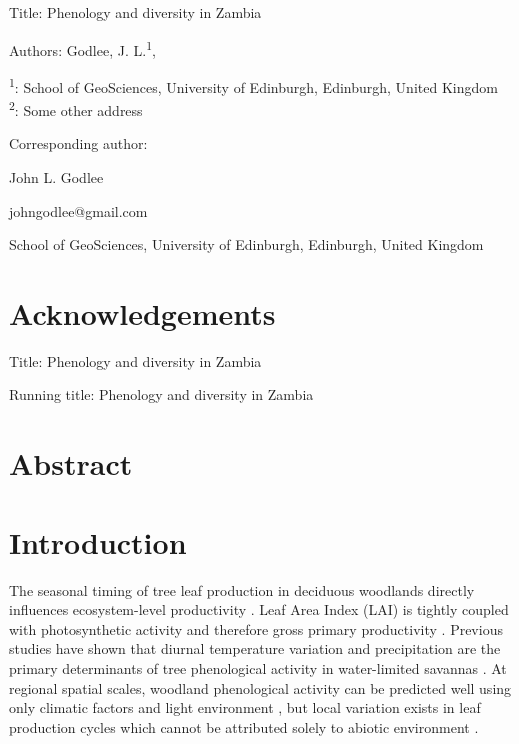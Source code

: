 \documentclass[11pt,a4paper]{article}
\newcommand{\titletext}{Phenology and diversity in Zambia}
\begin{document}
{\LARGE{Title: \titletext}}

\vspace{1cm}

Authors: Godlee, J. L.\textsuperscript{1}, 

\textsuperscript{1}: School of GeoSciences, University of Edinburgh, Edinburgh, United Kingdom \\
\textsuperscript{2}: Some other address

\vspace{1em}
Corresponding author:

John L. Godlee

johngodlee@gmail.com

School of GeoSciences, University of Edinburgh, Edinburgh, United Kingdom

\section{Acknowledgements}

\newpage{}


\LARGE{Title: \titletext}

\normalsize{Running title: \titletext}

\section{Abstract}

\section{Introduction}

The seasonal timing of tree leaf production in deciduous woodlands directly influences ecosystem-level productivity \citep{}. Leaf Area Index (LAI) is tightly coupled with photosynthetic activity and therefore gross primary productivity \citep{}. Previous studies have shown that diurnal temperature variation and precipitation are the primary determinants of tree phenological activity in water-limited savannas \citep{}. At regional spatial scales, woodland phenological activity can be predicted well using only climatic factors and light environment \citep{}, but local variation exists in leaf production cycles which cannot be attributed solely to abiotic environment \citep{}. 
\end{document}
